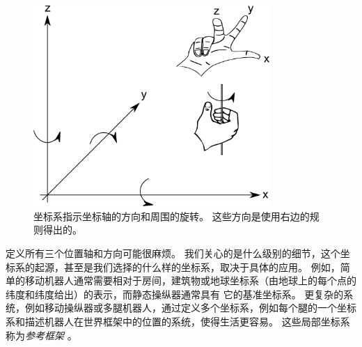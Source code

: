 \begin{figure}
	\centering
		\includegraphics[width=0.8\textwidth]{figs/coordinatesystem}
	\caption{坐标系指示坐标轴的方向和周围的旋转。 这些方向是使用右边的规则得出的。}
	\label{fig:coordinatesystem}
\end{figure}


定义所有三个位置轴和方向可能很麻烦。 我们关心的是什么级别的细节，这个坐标系的起源，甚至是我们选择的什么样的坐标系，取决于具体的应用。 例如，简单的移动机器人通常需要相对于房间，建筑物或地球坐标系（由地球上的每个点的纬度和纬度给出）的表示，而静态操纵器通常具有 它的基准坐标系。 更复杂的系统，例如移动操纵器或多腿机器人，通过定义多个坐标系，例如每个腿的一个坐标系和描述机器人在世界框架中的位置的系统，使得生活更容易。 这些局部坐标系称为\emph {参考框架} 。

